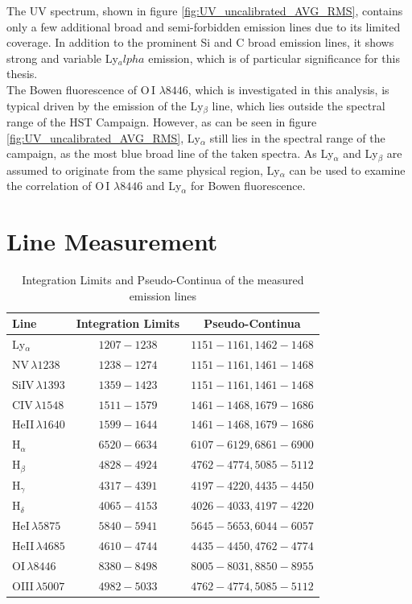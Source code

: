 The UV spectrum, shown in figure \ref{fig:UV_uncalibrated_AVG_RMS}, contains only a few additional broad and semi-forbidden emission lines due to its limited coverage. In addition to the prominent Si and C broad emission lines, it shows strong and variable Ly$_alpha$ emission, which is of particular significance for this thesis. \\
The Bowen fluorescence of O\,I $\lambda 8446$, which is investigated in this analysis, is typical driven by the emission of the Ly$_\beta$ line, which lies outside the spectral range of the HST Campaign. However, as can be seen in figure \ref{fig:UV_uncalibrated_AVG_RMS}, Ly$_\alpha$  still lies in the spectral range of the campaign, as the most blue broad line of the taken spectra. As Ly$_\alpha$ and Ly$_\beta$ are assumed to originate from the same physical region, Ly$_\alpha$ can be used to examine the correlation of O\,I $\lambda 8446$ and Ly$_\alpha$ for Bowen fluorescence.
 
 




\section{Line Measurement}

\begin{table}[h!]
	\centering
	\small
	\caption{Integration Limits and Pseudo-Continua of the measured emission lines}
	\label{tab:emission_lines}
	\begin{tabular}{lcc}
		\hline
		\hline
		\textbf{Line} & \textbf{Integration Limits} & \textbf{Pseudo-Continua}  \\
		\hline
		Ly$_\alpha$ & $1207 - 1238$ & $1151-1161, 1462 - 1468$\\
		NV$\,\lambda 1238$ & $1238-1274$ & $1151-1161, 1461-1468$ \\
		SiIV$\,\lambda 1393$ & $1359-1423$ & $1151-1161, 1461-1468$ \\
		CIV$\,\lambda 1548$ & $1511-1579$ & $1461-1468, 1679-1686$ \\
		HeII$\,\lambda 1640$& $1599-1644$ & $1461-1468, 1679-1686$ \\
		\hline
		H$_\alpha$ & $6520-6634$ & $6107-6129, 6861-6900$ \\
		H$_\beta$ & $4828-4924$ & $4762-4774, 5085-5112$ \\
		H$_\gamma$ & $4317-4391$ & $4197-4220, 4435-4450$ \\
		H$_\delta$ & $4065-4153$ & $4026-4033, 4197-4220$ \\
		
		HeI$\,\lambda5875$ & $5840-5941$ & $5645-5653, 6044-6057$ \\
		HeII$\,\lambda4685$ & $4610-4744$ & $4435-4450, 4762-4774$ \\
		OI$\,\lambda 8446$ & $8380-8498$ & $8005-8031, 8850-8955$ \\
		\hline
		OIII$\,\lambda 5007$ & $4982-5033$ & $4762-4774, 5085-5112$ \\
		\hline
		\hline
	\end{tabular}
\end{table}

